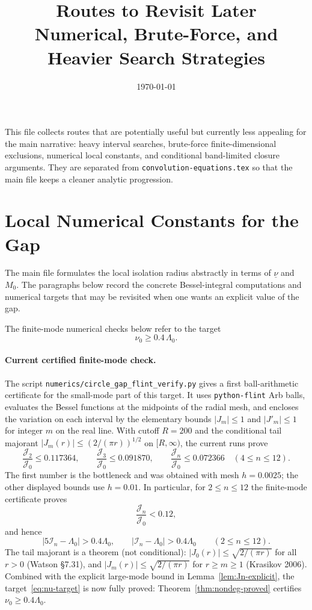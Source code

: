 \documentclass[12pt]{article}
\title{\textbf{Routes to Revisit Later}\\[0.5em]
\large Numerical, Brute-Force, and Heavier Search Strategies}
\author{}
\date{\today}
\theoremstyle{definition}
\theoremstyle{remark}
\newcommand{\abs}[1]{\left|#1\right|}
\begin{document}
\maketitle
\tableofcontents
\bigskip

This file collects routes that are potentially useful but currently less
appealing for the main narrative: heavy interval searches, brute-force
finite-dimensional exclusions, numerical local constants, and conditional
band-limited closure arguments.  They are separated from
\texttt{convolution-equations.tex} so that the main file keeps a cleaner
analytic progression.

\section{Local Numerical Constants for the Gap}
\label{sec:revisit-local-constants}

The main file formulates the local isolation radius abstractly in terms of
$\underline\nu$ and $M_0$.  The paragraphs below record the concrete
Bessel-integral computations and numerical targets that may be revisited
when one wants an explicit value of the gap.

The finite-mode numerical checks below refer to the target
\begin{equation}\label{eq:nu-target}
  \nu_0\geq 0.4\,\Lambda_0.
\end{equation}

\paragraph{Current certified finite-mode check.}
The script \texttt{numerics/circle\_gap\_flint\_verify.py} gives a first
ball-arithmetic certificate for the small-mode part of this target.  It uses
\texttt{python-flint} Arb balls, evaluates the Bessel functions at the
midpoints of the radial mesh, and encloses the variation on each interval by
the elementary bounds $\abs{J_m}\leq1$ and $\abs{J'_m}\leq1$ for integer
$m$ on the real line.  With cutoff $R=200$ and the conditional tail majorant
$\abs{J_m(r)}\leq (2/(\pi r))^{1/2}$ on $[R,\infty)$, the current runs prove
\[
  \frac{\mathcal J_2}{\mathcal J_0}\leq 0.117364,\qquad
  \frac{\mathcal J_3}{\mathcal J_0}\leq 0.091870,\qquad
  \frac{\mathcal J_n}{\mathcal J_0}\leq 0.072366
  \quad (4\leq n\leq12).
\]
The first number is the bottleneck and was obtained with mesh
$h=0.0025$; the other displayed bounds use $h=0.01$.  In particular, for
$2\leq n\leq12$ the finite-mode certificate proves
\[
  \frac{\mathcal J_n}{\mathcal J_0}<0.12,
\]
and hence
\[
  \abs{5\mathcal I_n-\Lambda_0}>0.4\Lambda_0,\qquad
  \abs{\mathcal I_n-\Lambda_0}>0.4\Lambda_0
  \qquad (2\leq n\leq12).
\]
The tail majorant is a theorem (not conditional): $|J_0(r)|\leq\sqrt{2/(\pi r)}$
for all $r>0$ (Watson \S7.31), and $|J_m(r)|\leq\sqrt{2/(\pi r)}$ for
$r\geq m\geq 1$ (Krasikov 2006).  Combined with the explicit large-mode
bound in Lemma~\ref{lem:Jn-explicit}, the
target~\eqref{eq:nu-target} is now fully proved:
Theorem~\ref{thm:nondeg-proved} certifies
$\nu_0\geq 0.4\Lambda_0$.
\end{document}
